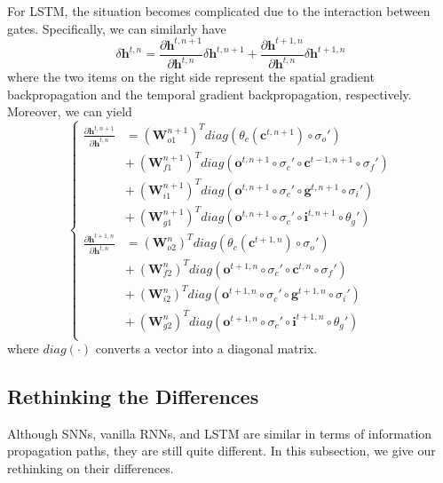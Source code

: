 \documentclass[journal,10pt,twocolumn]{IEEETran}
\begin{document}
For LSTM, the situation becomes complicated due to the interaction between gates. Specifically, we can similarly have
\begin{equation}
\label{equ:LSTM_bp1}
\delta \pmb{h}^{t,n}=\frac{\partial \pmb{h}^{t,n+1}}{\partial \pmb{h}^{t,n}} \delta \pmb{h}^{t,n+1} + \frac{\partial \pmb{h}^{t+1,n}}{\partial \pmb{h}^{t,n}} \delta \pmb{h}^{t+1,n}
\end{equation}
where the two items on the right side represent the spatial gradient backpropagation and the temporal gradient backpropagation, respectively. Moreover, we can yield
\begin{equation}
\label{equ:LSTM_bp2}
\begin{cases}
\frac{\partial \pmb{h}^{t,n+1}}{\partial \pmb{h}^{t,n}}&=(\pmb{W}_{o1}^{n+1})^Tdiag(\theta_c(\pmb{c}^{t,n+1})\circ \sigma_o')\\
&+~(\pmb{W}_{f1}^{n+1})^Tdiag(\pmb{o}^{t,n+1}\circ \sigma_c' \circ \pmb{c}^{t-1,n+1} \circ \sigma_f') \\ &+~(\pmb{W}_{i1}^{n+1})^Tdiag(\pmb{o}^{t,n+1}\circ \sigma_c' \circ \pmb{g}^{t,n+1} \circ \sigma_i')\\
&+~(\pmb{W}_{g1}^{n+1})^Tdiag(\pmb{o}^{t,n+1}\circ \sigma_c' \circ \pmb{i}^{t,n+1} \circ \theta_g')\\
\frac{\partial \pmb{h}^{t+1,n}}{\partial \pmb{h}^{t,n}}&=(\pmb{W}_{o2}^{n})^Tdiag(\theta_c(\pmb{c}^{t+1,n})\circ \sigma_o')\\
&+~(\pmb{W}_{f2}^{n})^Tdiag(\pmb{o}^{t+1,n}\circ \sigma_c' \circ \pmb{c}^{t,n} \circ \sigma_f') \\ &+~(\pmb{W}_{i2}^{n})^Tdiag(\pmb{o}^{t+1,n}\circ \sigma_c' \circ \pmb{g}^{t+1,n} \circ \sigma_i')\\
&+~(\pmb{W}_{g2}^{n})^Tdiag(\pmb{o}^{t+1,n}\circ \sigma_c' \circ \pmb{i}^{t+1,n} \circ \theta_g')\\
\end{cases}
\end{equation}
where $diag(\cdot)$ converts a vector into a diagonal matrix.

\subsection{Rethinking the Differences}

Although SNNs, vanilla RNNs, and LSTM are similar in terms of information propagation paths, they are still quite different. In this subsection, we give our rethinking on their differences.
\end{document}
